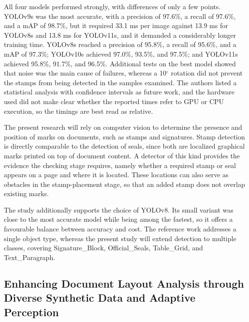 All four models performed strongly, with differences of only a few points.
YOLOv9s was the most accurate, with a precision of 97.6\%, a recall of 97.6\%, and a mAP of 98.7\%, but it required 33.1 ms per image against 13.9 ms for YOLOv8s and 13.8 ms for YOLOv11s, and it demanded a considerably longer training time.
YOLOv8s reached a precision of 95.8\%, a recall of 95.6\%, and a mAP of 97.3\%; YOLOv10s achieved 97.0\%, 93.5\%, and 97.5\%; and YOLOv11s achieved 95.8\%, 91.7\%, and 96.5\%.
Additional tests on the best model showed that noise was the main cause of failures, whereas a 10$^\circ$ rotation did not prevent the stamps from being detected in the samples examined.
The authors listed a statistical analysis with confidence intervals as future work, and the hardware used did not make clear whether the reported times refer to GPU or CPU execution, so the timings are best read as relative.

The present research will rely on computer vision to determine the presence and position of marks on documents, such as stamps and signatures.
Stamp detection is directly comparable to the detection of seals, since both are localized graphical marks printed on top of document content.
A detector of this kind provides the evidence the checking stage requires, namely whether a required stamp or seal appears on a page and where it is located.
These locations can also serve as obstacles in the stamp-placement stage, so that an added stamp does not overlap existing marks.

The study additionally supports the choice of YOLOv8.
Its small variant was close to the most accurate model while being among the fastest, so it offers a favourable balance between accuracy and cost.
The reference work addresses a single object type, whereas the present study will extend detection to multiple classes, covering Signature\_Block, Official\_Seals, Table\_Grid, and Text\_Paragraph.

\subsection{Enhancing Document Layout Analysis through Diverse Synthetic Data and Adaptive Perception}

